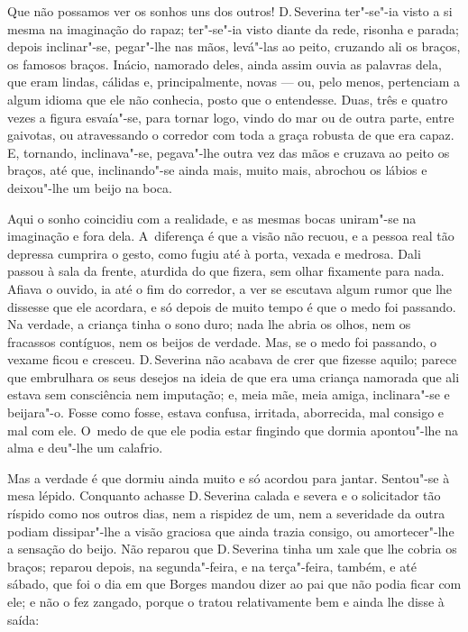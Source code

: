 \begin{linenumbers}
Que não possamos ver os sonhos uns dos outros! D.\,Severina ter"-se"-ia
visto a si mesma na imaginação do rapaz; ter"-se"-ia visto diante da rede,
risonha e parada; depois inclinar"-se, pegar"-lhe nas mãos, levá"-las ao
peito, cruzando ali os braços, os famosos braços. Inácio, namorado
deles, ainda assim ouvia as palavras dela, que eram lindas, cálidas e,
principalmente, novas --- ou, pelo menos, pertenciam a algum idioma que
ele não conhecia, posto que o entendesse. Duas, três e quatro vezes a
figura esvaía"-se, para tornar logo, vindo do mar ou de outra parte,
entre gaivotas, ou atravessando o corredor com toda a graça robusta de
que era capaz. E, tornando, inclinava"-se, pegava"-lhe outra vez das mãos
e cruzava ao peito os braços, até que, inclinando"-se ainda mais, muito
mais, abrochou os lábios e deixou"-lhe um beijo na boca.

Aqui o sonho coincidiu com a realidade, e as mesmas bocas uniram"-se na
imaginação e fora dela. A~diferença é que a visão não recuou, e a pessoa
real tão depressa cumprira o gesto, como fugiu até à porta, vexada e
medrosa. Dali passou à sala da frente, aturdida do que fizera, sem olhar
fixamente para nada. Afiava o ouvido, ia até o fim do corredor, a ver se
escutava algum rumor que lhe dissesse que ele acordara, e só depois de
muito tempo é que o medo foi passando. Na verdade, a criança tinha o
sono duro; nada lhe abria os olhos, nem os fracassos contíguos, nem os
beijos de verdade. Mas, se o medo foi passando, o vexame ficou e
cresceu. D.\,Severina não acabava de crer que fizesse aquilo; parece que
embrulhara os seus desejos na ideia de que era uma criança namorada que
ali estava sem consciência nem imputação; e, meia mãe, meia amiga,
inclinara"-se e beijara"-o. Fosse como fosse, estava confusa, irritada,
aborrecida, mal consigo e mal com ele. O~medo de que ele podia estar
fingindo que dormia apontou"-lhe na alma e deu"-lhe um calafrio.

Mas a verdade é que dormiu ainda muito e só acordou para jantar.
Sentou"-se à mesa lépido. Conquanto achasse D.\,Severina calada e severa e
o solicitador tão ríspido como nos outros dias, nem a rispidez de um,
nem a severidade da outra podiam dissipar"-lhe a visão graciosa que ainda
trazia consigo, ou amortecer"-lhe a sensação do beijo. Não reparou que D.\,Severina tinha um xale que lhe cobria os braços; reparou depois, na
segunda"-feira, e na terça"-feira, também, e até sábado, que foi o dia em
que Borges mandou dizer ao pai que não podia ficar com ele; e não o fez
zangado, porque o tratou relativamente bem e ainda lhe disse à saída:


\end{linenumbers}
